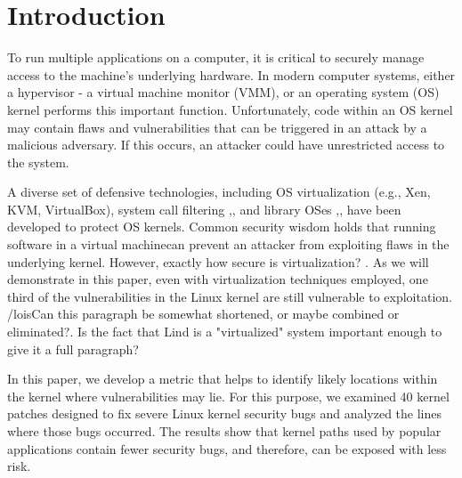 \section{Introduction}
\label{sec.introduction}

To run multiple applications on a computer, it is critical to securely
manage access to the machine's underlying hardware. In modern computer systems,
either a hypervisor - a virtual machine monitor (VMM), or an
operating system (OS) kernel performs this important function. Unfortunately,
code within an OS kernel may contain flaws and vulnerabilities that can be
triggered in an attack by a malicious adversary. If this occurs, an attacker
could have unrestricted access to the system.


A diverse set of defensive technologies, including OS virtualization (e.g., Xen,
 KVM, VirtualBox), system call filtering \cite{Janus:99},\cite{SCI-04},
and library OSes \cite{Bascule},\cite{Drawbridge-11}, have been developed to
protect OS kernels. Common security wisdom holds that running software in a
virtual machinecan prevent an attacker from exploiting flaws in the underlying
kernel.
However, exactly how secure is virtualization? \cite{Tal}. As we will
demonstrate in this paper, even with virtualization techniques employed, one
third of the vulnerabilities in the Linux kernel are still vulnerable to exploitation.
/lois{Can this paragraph be somewhat shortened, or maybe combined or eliminated?. Is the fact that Lind is a "virtualized" system important
enough to give it a full paragraph?}

In this paper, we develop a
metric that helps to identify likely locations within the kernel
where vulnerabilities may lie.
For this purpose, we examined 40 kernel patches designed to fix severe Linux
kernel security bugs and analyzed the lines where those bugs occurred.
The results show that kernel paths used by popular applications contain fewer
security bugs, and therefore, can be exposed with less risk.

